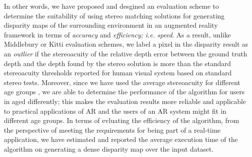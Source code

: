 In other words, we have proposed and desgined an evaluation scheme to determine the suitability of using stereo matching solutions for generating disparity maps of the surrounding 
environment in an augmented reality framework in terms of \textit{accuracy} and \textit{efficiency; i.e. speed}. 
As a result, unlike Middlebury or Kitti evaluation schemes, we label a pixel in the disparity result as an \textit{outlier} if the stereoacuity
of the relative depth error between the ground truth depth and the depth found by the stereo solution is more than the standard stereoacuity thresholds reported for human visual system based
on standard stereo tests. 
Moreover, since we have used the average stereoacuity for different age groups \cite{garn06}, we are able to determine the performance of the algorithm for users in aged differently; this
makes the evaluation results more reliable and applicable to practical applications of AR and the users of an AR system might fit in different age groups.
In terms of evluating the efficiency of the algorithm, from the perspective of meeting the requirements for being part of a real-time application, we have estimated and reported 
the average execution time of the algorithm on generating a dense disparity map over the input dataset.



